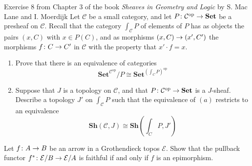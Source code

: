 \documentclass[a4paper]{article}
\begin{document}
\begin{snippetexercise}{Exercise 8 from Chapter 3 of the book \emph{Sheaves in Geometry and Logic} by S. Mac Lane and I. Moerdijk}
    Let \(\mathcal C\) be a small category, and let \(P \colon \mathcal C^{\text{op}} \to \mathbf{Set}\)
    be a presheaf on \(\mathcal C\). Recall that the category
    \(\int_{\mathcal C} P\) of elements of \(P\) has as objects the pairs
    \((x, C)\) with \(x \in P(C)\), and as morphisms \((x, C) \to (x', C')\) the morphisms
    \(f \colon C \to C'\) in \(\mathcal C\) with the property that \(x' \cdot f = x\).
    \begin{enumerate}[label=\Alph*]
        \item Prove that there is an equivalence of categories
        \[
            \mathbf{Set}^{\mathcal C^{\text{op}}} /P \cong \mathbf{Set}^{{\left(\int_C P\right)}^{\text{op}}}
        \]
        \item Suppose that \(J\) is a topology on \(\mathcal C\), and that \(P \colon \mathcal C^{\text{op}} \to \mathbf{Set}\)
        is a \(J\)-sheaf. Describe a topology \(J'\) on \(\int_{\mathcal C} P\) such that
        the equivalence of \((a)\) restricts to an equivalence
        \[
            \mathbf{Sh}\left(
                \mathcal C, J
            \right) \cong \mathbf{Sh} \left(
                \int_C P, J'
            \right)
        \]
    \end{enumerate}
\end{snippetexercise}

\begin{snippetexercise}{}
    Let \(f\colon A \to B\) be an arrow in a Grothendieck topos \(\mathcal E\).
    Show that the pullback functor \(f^* \colon \mathcal E / B \to \mathcal E / A\) is
    faithful if and only if \(f\) is an epimorphism.
\end{snippetexercise}
\end{document}
